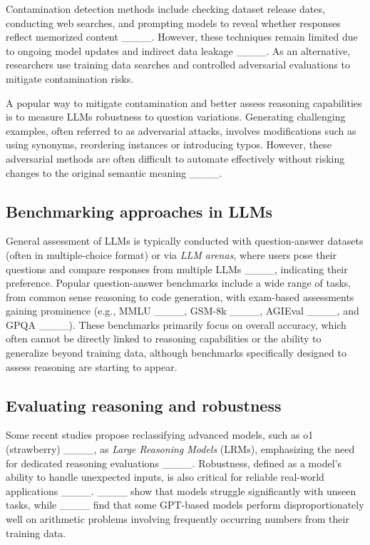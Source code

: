 Contamination detection methods include checking dataset release dates, conducting web searches, and prompting models to reveal whether responses reflect memorized content ____. However, these techniques remain limited due to ongoing model updates and indirect data leakage ____. As an alternative, researchers use training data searches and controlled adversarial evaluations to mitigate contamination risks.

A popular way to mitigate contamination and better assess reasoning capabilities is to measure LLMs robustness to question variations. Generating challenging examples, often referred to as adversarial attacks, involves modifications such as using synonyms, reordering instances or introducing typos. However, these adversarial methods are often difficult to automate effectively without risking changes to the original semantic meaning ____.

\subsection{Benchmarking approaches in LLMs}

General assessment of LLMs is typically conducted with question-answer datasets (often in multiple-choice format) or via \textit{LLM arenas}, where users pose their questions and compare responses from multiple LLMs ____, indicating their preference. Popular question-answer benchmarks include a wide range of tasks, from common sense reasoning to code generation, with exam-based assessments gaining prominence (e.g., MMLU ____, GSM-8k ____, AGIEval ____, and GPQA ____). These benchmarks primarily focus on overall accuracy, which often cannot be directly linked to reasoning capabilities or the ability to generalize beyond training data, although benchmarks specifically designed to assess reasoning are starting to appear.

\subsection{Evaluating reasoning and robustness}

Some recent studies propose reclassifying advanced models, such as o1 (strawberry) ____, as \textit{Large Reasoning Models} (LRMs), emphasizing the need for dedicated reasoning evaluations ____. Robustness, defined as a model's ability to handle unexpected inputs, is also critical for reliable real-world applications ____. ____ show that models struggle significantly with unseen tasks, while ____ find that some GPT-based models perform disproportionately well on arithmetic problems involving frequently occurring numbers from their training data.

